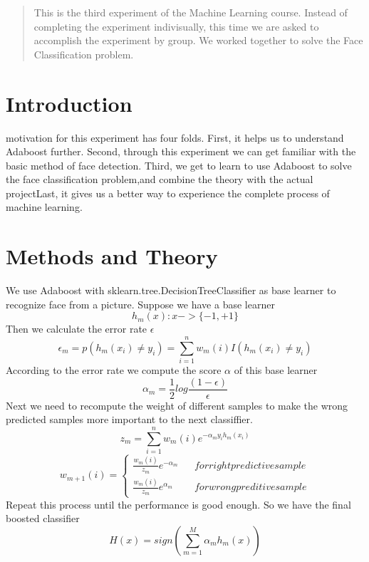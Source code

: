 \documentclass[journal, a4paper]{IEEEtran}
\begin{document}
\begin{abstract} 
This is the third experiment of the Machine Learning course. Instead of completing the experiment indivisually, this time we are asked to accomplish the experiment by group. We worked together to solve the Face Classification problem.
\end{abstract}

\section{Introduction}
 motivation for this experiment has four folds. First, it helps us to understand Adaboost further. Second, through this experiment we can get familiar with the basic method of face detection. Third, we get to learn to use Adaboost to solve the face classification problem,and combine the theory with the actual projectLast, it gives us a better way to experience the complete process of machine learning.

\section{Methods and Theory}
We use Adaboost with sklearn.tree.DecisionTreeClassifier as base learner to recognize face from a picture.
Suppose we have a base learner $$ h_m(x):x->\{-1,+1\} $$ Then we calculate the error rate $\epsilon$ $$ \epsilon _m = p(h_m(x_i)\not=y_i)=\sum_{i=1}^nw_m(i)I(h_m(x_i)\not=y_i) $$ According to the error rate we compute the score $\alpha$ of this base learner $$\alpha_m=\frac{1}{2}log\frac{(1-\epsilon)}{\epsilon}$$ Next we need to recompute the weight of different samples to make the wrong predicted samples more important to the next classiffier.$$z_m=\sum_{i=1}^nw_m(i)e^{-\alpha_my_ih_m(x_i)}$$ 
$$w_{m+1}(i)=\left\{\begin{array}{rcl}\frac{w_m(i)}{z_m}e^{-\alpha_m}&&{for right predictive sample}\\\frac{w_m(i)}{z_m}e^{\alpha_m}&&{for wrong preditive sample} 
\end{array} \right.$$ Repeat this process until the performance is good enough. So we have the final boosted classifier $$H(x)=sign(\sum_{m=1}^M\alpha_mh_m(x))$$
 
\end{document}

